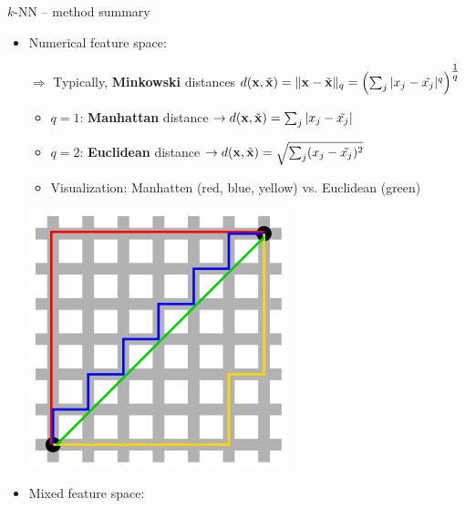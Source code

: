 \begin{frame}{$k$-NN -- method summary}


\begin{itemize}
  \item Numerical feature space:\\
  \begin{minipage}{0.7\textwidth}
  $\Rightarrow$ Typically, \textbf{Minkowski} distances
  $d(\mathbf{x}, \tilde{\mathbf{x}}) = \|\mathbf{x} - \tilde{\mathbf{x}} \|_q = 
  \left( \sum_j | x_j - \tilde{x_j} |^q
  \right)^{\tfrac{1}{q}}$
  \begin{itemize}
    \item $q = 1$: \textbf{Manhattan} distance $\rightarrow d(\mathbf{x}, \tilde{\mathbf{x}}) =
    \sum_j | x_j - \tilde{x_j} |$
  \item $q = 2$: \textbf{Euclidean} distance $\rightarrow d(\mathbf{x}, \tilde{\mathbf{x}}) =
  \sqrt{\sum_j (x_j - \tilde{x_j})^2}$
  \item Visualization: Manhatten (red, blue, yellow) vs. Euclidean (green)
  \end{itemize}
\end{minipage}%
\begin{minipage}{0.25\textwidth}
 \begin{center}
  \includegraphics[width=.6\textwidth]{learners-overview/figure/manhattan_distance.png} %
 \end{center}
\end{minipage}
    \medskip
  \item Mixed feature space: 
  \begin{itemize}

\end{itemize}
\end{itemize}
\end{frame}
